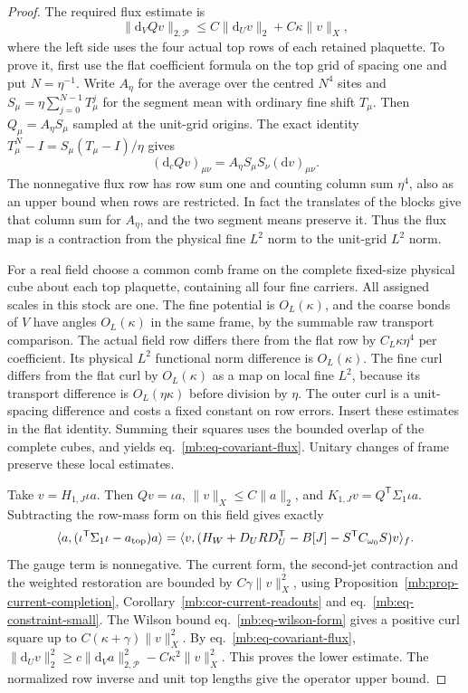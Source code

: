 \documentclass[11pt,letterpaper,reqno]{amsart}
\numberwithin{equation}{section}
\renewcommand{\eqref}[1]{\textup{eq.~\ref{#1}}}
\theoremstyle{definition}
\theoremstyle{remark}
\begin{document}
\begin{proof}
The required flux estimate is
\begin{equation}\label{mb:eq-covariant-flux}
 \|\mathrm d_V Qv\|_{2,\mathcal P}
                       \le C\|\mathrm d_Uv\|_2+C\kappa\|v\|_X ,
\end{equation}
where the left side uses the four actual top rows of each
retained plaquette. To prove it, first use the flat
coefficient formula on the top grid of spacing one and
put \(N=\eta^{-1}\). Write \(A_\eta\) for the average over
the centred \(N^4\) sites and
\(S_\mu=\eta\sum_{j=0}^{N-1}T_\mu^j\) for the segment mean
with ordinary fine shift \(T_\mu\). Then \(Q_\mu=A_\eta S_\mu\)
sampled at the unit-grid origins. The exact identity
\(T_\mu^N-I=S_\mu(T_\mu-I)/\eta\) gives
\[
  (\mathrm d_c Qv)_{\mu\nu}
       = A_\eta S_\mu S_\nu(\mathrm d v)_{\mu\nu}.
\]
The nonnegative flux row has row sum one and counting
column sum \(\eta^4\), also as an upper bound when rows
are restricted. In fact the translates of the blocks give
that column sum for \(A_\eta\), and the two segment means
preserve it. Thus the flux map is a contraction from the
physical fine \(L^2\) norm to the unit-grid \(L^2\) norm.

For a real field choose a common comb frame on the complete
fixed-size physical cube about each top plaquette, containing
all four fine carriers. All assigned scales in this stock
are one. The fine potential is \(O_L(\kappa)\), and the
coarse bonds of \(V\) have angles \(O_L(\kappa)\) in the
same frame, by the summable raw transport comparison.
The actual field row differs there from the flat row by
\(C_L\kappa\eta^4\) per coefficient. Its physical \(L^2\)
functional norm difference is \(O_L(\kappa)\). The fine
curl differs from the flat curl by \(O_L(\kappa)\) as a
map on local fine \(L^2\), because its transport difference
is \(O_L(\eta\kappa)\) before division by \(\eta\).
The outer curl is a unit-spacing difference and costs a
fixed constant on row errors. Insert these estimates in
the flat identity. Summing their squares uses the bounded
overlap of the complete cubes, and yields
\eqref{mb:eq-covariant-flux}. Unitary changes of frame
preserve these local estimates.

Take \(v=H_{1,J}\iota a\). Then \(Qv=\iota a\),
\(\|v\|_X\le C\|a\|_2\), and
\(K_{1,J}v=Q^{\mathsf T}\Sigma_1\iota a\).
Subtracting the row-mass form on this field gives exactly
\[
 \langle a,(\iota^{\mathsf T}\Sigma_1\iota-a_{\rm top})a\rangle
 =\langle v,(H_W+D_URD_U^{\mathsf T}-B[J]
                       -S^{\mathsf T}C_{\omega_0}S)v\rangle_f .
\]
The gauge term is nonnegative. The current form, the
second-jet contraction and the weighted restoration are
bounded by \(C\gamma\|v\|_X^2\), using
Proposition~\ref{mb:prop-current-completion},
Corollary~\ref{mb:cor-current-readouts} and
\eqref{mb:eq-constraint-small}. The Wilson bound
\eqref{mb:eq-wilson-form} gives a positive curl square
up to \(C(\kappa+\gamma)\|v\|_X^2\).
By \eqref{mb:eq-covariant-flux},
\(\|\mathrm d_Uv\|_2^2\ge
 c\|\mathrm d_Va\|_{2,\mathcal P}^2-C\kappa^2\|v\|_X^2\).
This proves the lower estimate. The normalized row inverse
and unit top lengths give the operator upper bound.
\end{proof}
\end{document}
